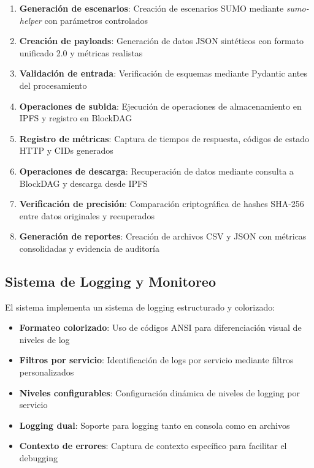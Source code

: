 \documentclass[onecolumn]{article}
\begin{document}
\begin{enumerate}
    \item \textbf{Generación de escenarios}: Creación de escenarios SUMO mediante \textit{sumo-helper} con parámetros controlados
    \item \textbf{Creación de payloads}: Generación de datos JSON sintéticos con formato unificado 2.0 y métricas realistas
    \item \textbf{Validación de entrada}: Verificación de esquemas mediante Pydantic antes del procesamiento
    \item \textbf{Operaciones de subida}: Ejecución de operaciones de almacenamiento en IPFS y registro en BlockDAG
    \item \textbf{Registro de métricas}: Captura de tiempos de respuesta, códigos de estado HTTP y CIDs generados
    \item \textbf{Operaciones de descarga}: Recuperación de datos mediante consulta a BlockDAG y descarga desde IPFS
    \item \textbf{Verificación de precisión}: Comparación criptográfica de hashes SHA-256 entre datos originales y recuperados
    \item \textbf{Generación de reportes}: Creación de archivos CSV y JSON con métricas consolidadas y evidencia de auditoría
\end{enumerate}

\subsection{Sistema de Logging y Monitoreo}

El sistema implementa un sistema de logging estructurado y colorizado:

\begin{itemize}
    \item \textbf{Formateo colorizado}: Uso de códigos ANSI para diferenciación visual de niveles de log
    \item \textbf{Filtros por servicio}: Identificación de logs por servicio mediante filtros personalizados
    \item \textbf{Niveles configurables}: Configuración dinámica de niveles de logging por servicio
    \item \textbf{Logging dual}: Soporte para logging tanto en consola como en archivos
    \item \textbf{Contexto de errores}: Captura de contexto específico para facilitar el debugging
\end{itemize}
\end{document}

